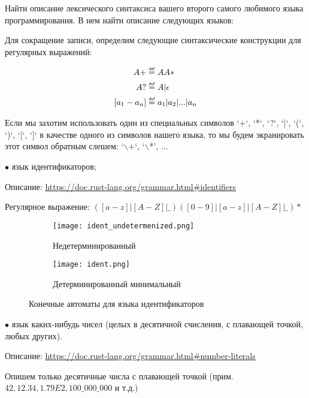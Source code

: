 
\graphicspath{{../1/}{../2/}}
\newcommand\eqdef{\mathrel{\overset{\makebox[0pt]{\mbox{\normalfont\tiny\sffamily def}}}{=}}}

\begin{problem}
    Найти описание лексического синтаксиса вашего второго самого любимого языка программирования. В нем найти описание следующих языков:
\end{problem}

Для сокращение записи, определим следующие синтаксические конструкции
для регулярных выражений:

\begin{align*}
    A+ &\eqdef AA* \\
    A? &\eqdef A|\epsilon \\
    [a_1-a_n] &\eqdef a_1 | a_2 | ... | a_n
\end{align*}

Если мы захотим использовать один из специальных символов 
`+`, `*`, `?`, `|`, `(`, `)`, `[`, `]` в качестве одного из символов нашего языка, 
то мы будем экранировать этот символ обратным слешем: `$\backslash$+`, `$\backslash$*', ...  

$\bullet$ язык идентификаторов;

Описание: \url{https://doc.rust-lang.org/grammar.html#identifiers}

Регулярное выражение: $([a-z]|[A-Z]|\_)([0-9]|[a-z]|[A-Z]|\_)*$

\begin{figure}[h]
    \centering
    \begin{subfigure}[b]{0.4\linewidth}
      \texttt{[image: ident\_undetermenized.png]}
      \caption{Недетерминированный}
    \end{subfigure}
    \begin{subfigure}[b]{0.4\linewidth}
      \texttt{[image: ident.png]}
      \caption{Детерминированный минимальный}
    \end{subfigure}
    \caption{Конечные автоматы для языка идентификаторов}
\end{figure}

\break

$\bullet$ язык каких-нибудь чисел (целых в десятичной счисления, с плавающей точкой,
любых других).

Описание: \url{https://doc.rust-lang.org/grammar.html#number-literals}

Опишем только десятичные числа с плавающей точкой 
(прим. $42, 12.34, 1.79E2, 100\_000\_000$ и т.д.) 

